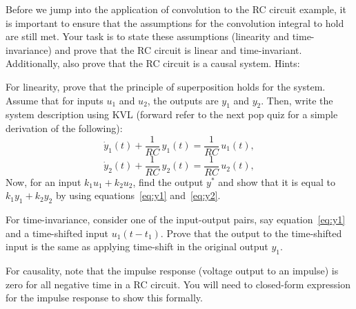 \begin{popquiz}
    Before we jump into the application of convolution to the RC circuit example, it is important to ensure that the assumptions for the convolution integral to hold are still met. Your task is to state these assumptions (linearity and time-invariance) and prove that the RC circuit is linear and time-invariant. Additionally, also prove that the RC circuit is a causal system.
    \popqsplit
    Hints:
    
    For linearity, prove that the principle of superposition holds for the system. Assume that for inputs $u_1$ and $u_2$, the outputs are $y_1$ and $y_2$. 
    Then, write the system description using KVL (forward refer to the next pop quiz for a simple derivation of the following):
    \begin{equation}
        \label{eq:y1}
    \dot y_1(t)+\frac{1}{RC}\,y_1(t)=\frac{1}{RC}\,u_1(t),
    \end{equation}
    \begin{equation}
    \dot y_2(t)+\frac{1}{RC}\,y_2(t)=\frac{1}{RC}\,u_2(t),
    \label{eq:y2}
    \end{equation}
    Now, for an input $k_1u_1 + k_2u_2$, find the output $y^*$ and show that it is equal to $k_1y_1 + k_2y_2$ by using equations~\eqref{eq:y1} and~\eqref{eq:y2}. 

    For time-invariance, consider one of the input-output pairs, say equation~\eqref{eq:y1} and a time-shifted input $u_1(t - t_1)$. Prove that the output to the time-shifted input is the same as applying time-shift in the original output $y_1$.

    For causality, note that the impulse response (voltage output to an impulse) is zero for all negative time in a RC circuit. You will need to closed-form expression for the impulse response to show this formally.
\end{popquiz}

